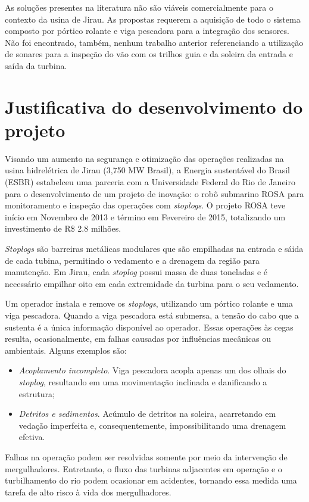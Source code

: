 As soluções presentes na literatura não são viáveis comercialmente
para o contexto da usina de Jirau. As propostas requerem a aquisição de todo o
sistema composto por pórtico rolante e viga pescadora para a integração dos
sensores. Não foi encontrado, também, nenhum trabalho anterior referenciando a
utilização de sonares para a inspeção do vão com os trilhos guia e da soleira da
entrada e saída da turbina.


\section{Justificativa do desenvolvimento do projeto}
Visando um aumento na segurança e otimização das operações realizadas na usina 
hidrelétrica de Jirau (3,750 MW Brasil), a Energia sustentável do Brasil (ESBR)
estabelceu uma parceria com a Universidade Federal do Rio de Janeiro para o desenvolvimento de um projeto de 
inovação: o robô submarino ROSA para monitoramento e inspeção das operações com
\textit{stoplogs}. O projeto ROSA teve início em Novembro de 2013 e término em
Fevereiro de 2015, totalizando um investimento de R\$ 2.8 milhões.

\textit{Stoplogs} são barreiras metálicas modulares que são empilhadas na
entrada e sáida de cada tubina, permitindo o vedamento e a drenagem da
região para manutenção. Em Jirau, cada \textit{stoplog} possui massa de duas
toneladas e é necessário empilhar oito em cada extremidade da turbina para o seu
vedamento.

Um operador instala e remove os \textit{stoplogs}, utilizando um pórtico
rolante e uma viga pescadora. Quando a viga pescadora está submersa, a tensão
do cabo que a sustenta é a única informação disponível ao operador. Essas
operações às cegas resulta, ocasionalmente, em falhas causadas por
influências mecânicas ou ambientais. Alguns exemplos são:

\begin{itemize}
\item \textit{Acoplamento incompleto}. Viga pescadora acopla apenas um dos
olhais do \textit{stoplog}, resultando em uma movimentação inclinada e danificando a estrutura;
\item \textit{Detritos e sedimentos}. Acúmulo de detritos na soleira,
acarretando em vedação imperfeita e, consequentemente, impossibilitando uma
drenagem efetiva.
\end{itemize}

Falhas na operação podem ser resolvidas somente por meio da intervenção de
mergulhadores. Entretanto, o fluxo das turbinas adjacentes em operação e o
turbilhamento do rio podem ocasionar em acidentes, tornando essa medida uma 
tarefa de alto risco à vida dos mergulhadores.


